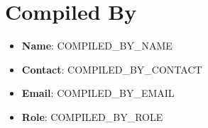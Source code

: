 \documentclass[12pt]{article}
\begin{document}
\section{Compiled By}
\begin{itemize}
    \item \textbf{Name}: {{COMPILED_BY_NAME}}
    \item \textbf{Contact}: {{COMPILED_BY_CONTACT}}
    \item \textbf{Email}: {{COMPILED_BY_EMAIL}}
    \item \textbf{Role}: {{COMPILED_BY_ROLE}}
\end{itemize}
\end{document}

